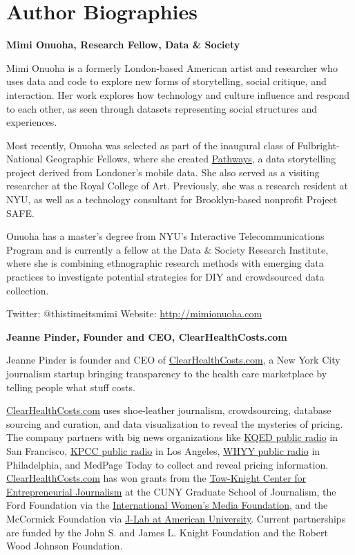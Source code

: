 \documentclass[notoc, symmetric, nobib, nols]{towcenter-guideto-book}
\begin{document}
\section{Author Biographies}

\textbf{Mimi Onuoha, Research Fellow, Data \& Society} 

Mimi Onuoha is a formerly London-based American artist and researcher who uses data and code to explore new forms of storytelling, social critique, and interaction. Her work explores how technology and culture influence and respond to each other, as seen through datasets representing social structures and experiences.

Most recently, Onuoha was selected as part of the inaugural class of Fulbright-National Geographic Fellows, where she created \href{http://www.nationalgeographic.com/pathways}{Pathways},\autocite{Pathways} a data storytelling project derived from Londoner's mobile data. She also served as a visiting researcher at the Royal College of Art. Previously, she was a research resident at NYU, as well as a technology consultant for Brooklyn-based nonprofit Project SAFE. 

Onuoha has a master's degree from NYU's Interactive Telecommunications Program and is currently a fellow at the Data \& Society Research Institute, where she is combining ethnographic research methods with emerging data practices to investigate potential strategies for DIY and crowdsourced data collection.

Twitter: @thistimeitsmimi 
Website: \href{http://mimionuoha.com}{http://mimionuoha.com}

\textbf{Jeanne Pinder, Founder and CEO, ClearHealthCosts.com}

Jeanne Pinder is founder and CEO of \href{http://clearhealthcosts.com/}{ClearHealthCosts.com}, a New York City journalism startup bringing transparency to the health care marketplace by telling people what stuff costs. 

\href{http://clearhealthcosts.com/}{ClearHealthCosts.com} uses shoe-leather journalism, crowdsourcing, database sourcing and curation, and data visualization to reveal the mysteries of pricing. The company partners with big news organizations like \href{http://ww2.kqed.org/stateofhealth/2014/06/23/share-your-bill-make-health-costs-transparent-in-california/}{KQED public radio} in San Francisco, \href{http://www.scpr.org/price-check}{KPCC public radio} in Los Angeles, \href{http://www.newsworks.org/index.php/local/item/77899}{WHYY public radio} in Philadelphia, and MedPage Today to collect and reveal pricing information. \href{http://clearhealthcosts.com/}{ClearHealthCosts.com} has won grants from the \href{http://towknight.org/2010/12/2010awards/}{Tow-Knight Center for Entrepreneurial Journalism} at the CUNY Graduate School of Journalism, the Ford Foundation via the \href{http://www.iwmf.org/women-entrepreneurs-in-digital-news-jeanne-pinder/}{International Women's Media Foundation}, and the McCormick Foundation via \href{http://www.newmediawomen.org/site/2012_winners}{J-Lab at American University}. Current partnerships are funded by the John S. and James L. Knight Foundation and the Robert Wood Johnson Foundation.
\end{document}
